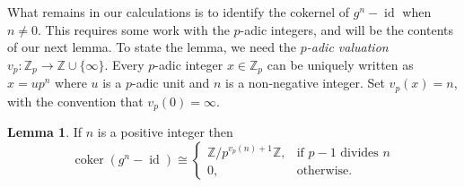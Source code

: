 \documentclass[a4paper]{article} %
\theoremstyle{definition}
\newtheorem{lemma}[theorem]{Lemma}
\newcommand{\Z}{\mathbb{Z}}
\DeclareMathOperator{\id}{id}           %
\DeclareMathOperator{\coker}{coker}     %
\begin{document}
What remains in our calculations is to identify the cokernel of $g^n-\id$ when $n \neq 0$. This requires some work with the $p$-adic integers, and will be the contents of our next lemma. To state the lemma, we need the \textit{$p$-adic valuation} $v_p \colon \Z_p \to \Z \cup \{\infty\}$. Every $p$-adic integer $x \in \Z_p$ can be uniquely written as $x = up^n$ where $u$ is a $p$-adic unit and $n$ is a non-negative integer. Set $v_p(x) = n$, with the convention that $v_p(0) = \infty$.
\begin{lemma}
  If $n$ is a positive integer then
  \[
    \coker(g^n - \id) \cong \begin{cases}
      \Z/p^{v_p(n)+1}\Z, & \text{if } p-1 \text{ divides } n \\
      0, & \text{otherwise}.
  \end{cases}
  \]
\end{lemma}
\end{document}
